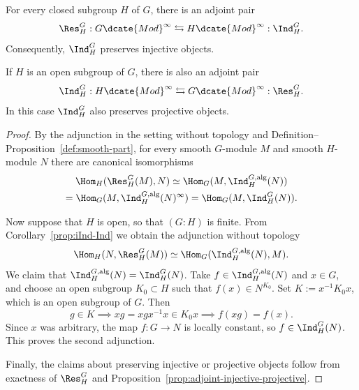 \begin{proposition}\label{prop:Ind-injective-profinite}
	For every closed subgroup $H$ of $G$, there is an adjoint pair
	\[ \Res^G_H:G\dcate{Mod}^\infty
	\leftrightarrows H\dcate{Mod}^\infty:\Ind^G_H. \]
	Consequently, $\Ind^G_H$ preserves injective objects.

	If $H$ is an open subgroup of $G$, there is also an adjoint pair
	\[ \Ind^G_H:H\dcate{Mod}^\infty
	\leftrightarrows G\dcate{Mod}^\infty:\Res^G_H. \]
	In this case $\Ind^G_H$ also preserves projective objects.
\end{proposition}
\begin{proof}
	By the adjunction in the setting without topology and
	Definition--Proposition~\ref{def:smooth-part}, for every smooth
	$G$-module $M$ and smooth $H$-module $N$ there are canonical
	isomorphisms
	\begin{multline*}
		\Hom_H(\Res^G_H(M),N)
		\simeq\Hom_G(M,\Ind^{G,\mathrm{alg}}_H(N))\\
		=\Hom_G(M,\Ind^{G,\mathrm{alg}}_H(N)^\infty)
		=\Hom_G(M,\Ind^G_H(N)).
	\end{multline*}

	Now suppose that $H$ is open, so that $(G:H)$ is finite. From
	Corollary~\ref{prop:iInd-Ind} we obtain the adjunction without topology
	\[ \Hom_H(N,\Res^G_H(M))
	\simeq\Hom_G(\Ind^{G,\mathrm{alg}}_H(N),M). \]
	We claim that
	$\Ind^{G,\mathrm{alg}}_H(N)=\Ind^G_H(N)$. Take
	$f\in\Ind^{G,\mathrm{alg}}_H(N)$ and $x\in G$, and choose an open
	subgroup $K_0\subset H$ such that $f(x)\in N^{K_0}$. Set
	$K:=x^{-1}K_0x$, which is an open subgroup of $G$. Then
	\[ g\in K\implies xg=xgx^{-1}x\in K_0x
	\implies f(xg)=f(x). \]
	Since $x$ was arbitrary, the map $f:G\to N$ is locally constant, so
	$f\in\Ind^G_H(N)$. This proves the second adjunction.

	Finally, the claims about preserving injective or projective objects
	follow from exactness of $\Res^G_H$ and
	Proposition~\ref{prop:adjoint-injective-projective}.
\end{proof}

